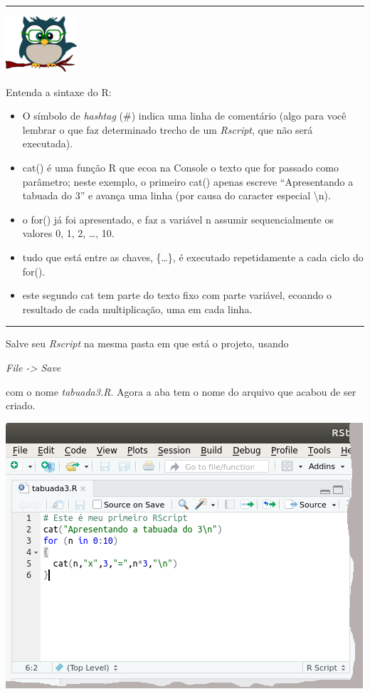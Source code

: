 \documentclass[
]{article}
\providecommand{\tightlist}{%
  \setlength{\itemsep}{0pt}\setlength{\parskip}{0pt}}
\begin{document}
\begin{center}\rule{0.5\linewidth}{0.5pt}\end{center}

\begin{flushleft}\includegraphics[width=0.08\linewidth]{coruja} \end{flushleft}

Entenda a sintaxe do R:

\begin{itemize}
\tightlist
\item
  O símbolo de \emph{hashtag} (\#) indica uma linha de comentário (algo
  para você lembrar o que faz determinado trecho de um \emph{Rscript},
  que não será executada).
\item
  cat() é uma função R que ecoa na Console o texto que for passado como
  parâmetro; neste exemplo, o primeiro cat() apenas escreve
  ``Apresentando a tabuada do 3'' e avança uma linha (por causa do
  caracter especial \textbackslash n).
\item
  o for() já foi apresentado, e faz a variável n assumir sequencialmente
  os valores 0, 1, 2, \ldots, 10.
\item
  tudo que está entre as chaves, \{\ldots\}, é executado repetidamente a
  cada ciclo do for().
\item
  este segundo cat tem parte do texto fixo com parte variável, ecoando o
  resultado de cada multiplicação, uma em cada linha.
\end{itemize}

\begin{center}\rule{0.5\linewidth}{0.5pt}\end{center}

Salve seu \emph{Rscript} na mesma pasta em que está o projeto, usando

\emph{File -\textgreater{} Save}

com o nome \emph{tabuada3.R}. Agora a aba tem o nome do arquivo que
acabou de ser criado.

\begin{center}\includegraphics[width=0.9\linewidth]{RStudio_RScriptsalvo} \end{center}
\end{document}
